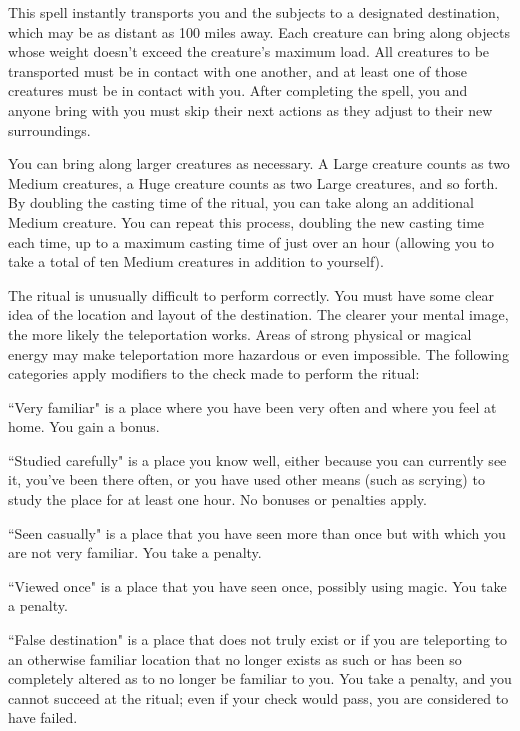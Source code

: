 \begin{spelleffect}
This spell instantly transports you and the subjects to a designated destination, which may be as distant as 100 miles away. Each creature can bring along objects whose weight doesn't exceed the creature's maximum load. All creatures to be transported must be in contact with one another, and at least one of those creatures must be in contact with you. After completing the spell, you and anyone bring with you must skip their next actions as they adjust to their new surroundings.
\par You can bring along larger creatures as necessary. A Large creature counts as two Medium creatures, a Huge creature counts as two Large creatures, and so forth. By doubling the casting time of the ritual, you can take along an additional Medium creature. You can repeat this process, doubling the new casting time each time, up to a maximum casting time of just over an hour (allowing you to take a total of ten Medium creatures in addition to yourself).
\par The  ritual is unusually difficult to perform correctly. You must have some clear idea of the location and layout of the destination. The clearer your mental image, the more likely the teleportation works. Areas of strong physical or magical energy may make teleportation more hazardous or even impossible. The following categories apply modifiers to the check made to perform the ritual:
\begin{itemize*}
\item ``Very familiar" is a place where you have been very often and where you feel at home. You gain a  bonus.
\item ``Studied carefully" is a place you know well, either because you can currently see it, you've been there often, or you have used other means (such as scrying) to study the place for at least one hour. No bonuses or penalties apply.
\item ``Seen casually" is a place that you have seen more than once but with which you are not very familiar. You take a  penalty.
\item ``Viewed once" is a place that you have seen once, possibly using magic. You take a  penalty.
\item ``False destination" is a place that does not truly exist or if you are teleporting to an otherwise familiar location that no longer exists as such or has been so completely altered as to no longer be familiar to you. You take a  penalty, and you cannot succeed at the ritual; even if your check would pass, you are considered to have failed.
\end{itemize*}


\end{spelleffect}
